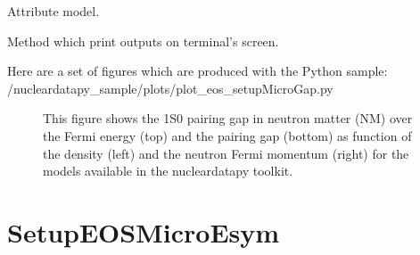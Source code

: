 \documentclass[letterpaper,10pt,english]{sphinxmanual}
\begin{document}
\begin{fulllineitems}
\begin{fulllineitems}
\end{fulllineitems}


\begin{fulllineitems}
\label{\detokenize{source/api/setup_eos_micro_gap:nucleardatapy.eos.setup_micro_gap.setupMicroGap.model}}
\pysigstartsignatures
{}
\pysigstopsignatures
\sphinxAtStartPar
Attribute model.

\end{fulllineitems}


\begin{fulllineitems}
\label{\detokenize{source/api/setup_eos_micro_gap:nucleardatapy.eos.setup_micro_gap.setupMicroGap.print_outputs}}
\pysigstartsignatures
{}
\pysigstopsignatures
\sphinxAtStartPar
Method which print outputs on terminal’s screen.

\end{fulllineitems}


\end{fulllineitems}


\sphinxAtStartPar
Here are a set of figures which are produced with the Python sample: /nucleardatapy\_sample/plots/plot\_eos\_setupMicroGap.py

\begin{figure}[htbp]
\centering
\capstart

\noindent{}
\caption{This figure shows the 1S0 pairing gap in neutron matter (NM) over the Fermi energy (top) and the pairing gap (bottom) as function of the density (left) and the neutron Fermi momentum (right) for the models available in the nucleardatapy toolkit.}\label{\detokenize{source/api/setup_eos_micro_gap:id1}}\end{figure}

\sphinxstepscope


\section{SetupEOSMicroEsym}
\label{\detokenize{source/api/setup_eos_micro_esym:setupeosmicroesym}}\label{\detokenize{source/api/setup_eos_micro_esym::doc}}\label{\detokenize{source/api/setup_eos_micro_esym:module-nucleardatapy.eos.setup_micro_esym}}
\end{document}
